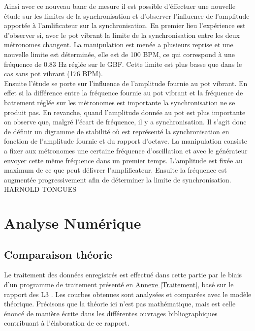 \documentclass[a4paper,11pt]{report}
\begin{document}
Ainsi avec ce nouveau banc de mesure il est possible d'éffectuer une nouvelle étude sur les limites de la synchronisation et d'observer l'influence de l'amplitude apportée à l'amlificateur sur la synchronisation. En premier lieu l'expérience est d'observer si, avec le pot vibrant la limite de la synchronisation entre les deux métronomes changent. La manipulation est menée a plusieurs reprise et une nouvelle limite est déterminée, elle est de 100 BPM, ce qui correspond à une fréquence de 0.83 Hz réglée sur le GBF. Cette limite est plus basse que dans le cas sans pot vibrant (176 BPM).\\

	Ensuite l'étude se porte sur l'influence de l'amplitude fournie au pot vibrant. En effet si la différence entre la fréquence fournie au pot vibrant et la fréquence de battement réglée sur les métronomes est importante la synchronisation ne se produit pas. En revanche, quand l'amplitude donnée au pot est plus importante on observe que, malgré l'écart de fréquence, il y a synchronisation. Il s'agit donc de définir un digramme de stabilité où est représenté la synchronisation en fonction de l'amplitude fournie et du rapport d'octave. La manipulation consiste a fixer aux métronomes une certaine fréquence d'oscillation et avec le générateur envoyer cette même fréquence dans un premier temps. L'amplitude est fixée au maximum de ce que peut délivrer l'amplificateur. Ensuite la fréquence est augmentée progressivement afin de déterminer la limite de synchronisation.\\

HARNOLD TONGUES

\chapter{Analyse Numérique}
\section{Comparaison théorie}
Le traitement des données enregistrés est effectué dans cette partie par le biais d'un programme de traitement présenté en \underline{Annexe \ref{Traitement}}, basé sur le rapport des L3 \cite{ram}. Les courbes obtenues sont analysées et comparées avec le modèle théorique. Précisons que la théorie ici n'est pas mathématique, mais est celle énoncé de manière écrite dans les différentes ouvrages bibliographiques contribuant à l'élaboration de ce rapport.
\end{document}
